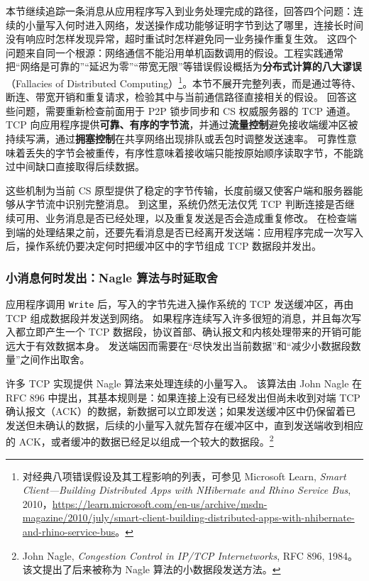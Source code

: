 本节继续追踪一条消息从应用程序写入到业务处理完成的路径，回答四个问题：连续的小量写入何时进入网络，发送操作成功能够证明字节到达了哪里，连接长时间没有响应时怎样发现异常，超时重试时怎样避免同一业务操作重复生效。
这四个问题来自同一个根源：网络通信不能沿用单机函数调用的假设。工程实践通常把“网络是可靠的”“延迟为零”“带宽无限”等错误假设概括为\textbf{分布式计算的八大谬误}（Fallacies of Distributed Computing）\footnote{对经典八项错误假设及其工程影响的列表，可参见 Microsoft Learn, \textit{Smart Client---Building Distributed Apps with NHibernate and Rhino Service Bus}, 2010，\url{https://learn.microsoft.com/en-us/archive/msdn-magazine/2010/july/smart-client-building-distributed-apps-with-nhibernate-and-rhino-service-bus}。}。本节不展开完整列表，而是通过等待、断连、带宽开销和重复请求，检验其中与当前通信路径直接相关的假设。
回答这些问题，需要重新检查前面用于 P2P 锁步同步和 CS 权威服务器的 TCP 通道。
TCP 向应用程序提供\textbf{可靠、有序的字节流}，并通过\textbf{流量控制}避免接收端缓冲区被持续写满，通过\textbf{拥塞控制}在共享网络出现排队或丢包时调整发送速率。
可靠性意味着丢失的字节会被重传，有序性意味着接收端只能按原始顺序读取字节，不能跳过中间缺口直接取得后续数据。

这些机制为当前 CS 原型提供了稳定的字节传输，长度前缀又使客户端和服务器能够从字节流中识别完整消息。
到这里，系统仍然无法仅凭 TCP 判断连接是否继续可用、业务消息是否已经处理，以及重复发送是否会造成重复修改。
在检查端到端的处理结果之前，还要先看消息是否已经离开发送端：应用程序完成一次写入后，操作系统仍要决定何时把缓冲区中的字节组成 TCP 数据段并发出。

\subsubsection{小消息何时发出：Nagle 算法与时延取舍}

应用程序调用 \texttt{Write} 后，写入的字节先进入操作系统的 TCP 发送缓冲区，再由 TCP 组成数据段并发送到网络。
如果程序连续写入许多很短的消息，并且每次写入都立即产生一个 TCP 数据段，协议首部、确认报文和内核处理带来的开销可能远大于有效数据本身。
发送端因而需要在“尽快发出当前数据”和“减少小数据段数量”之间作出取舍。

许多 TCP 实现提供 Nagle 算法来处理连续的小量写入。
该算法由 John Nagle 在 RFC 896 中提出，其基本规则是：如果连接上没有已经发出但尚未收到对端 TCP 确认报文（ACK）的数据，新数据可以立即发送；如果发送缓冲区中仍保留着已发送但未确认的数据，后续的小量写入就先暂存在缓冲区中，直到发送端收到相应的 ACK，或者缓冲的数据已经足以组成一个较大的数据段。\footnote{John Nagle, \textit{Congestion Control in IP/TCP Internetworks}, RFC 896, 1984。该文提出了后来被称为 Nagle 算法的小数据段发送方法。}

